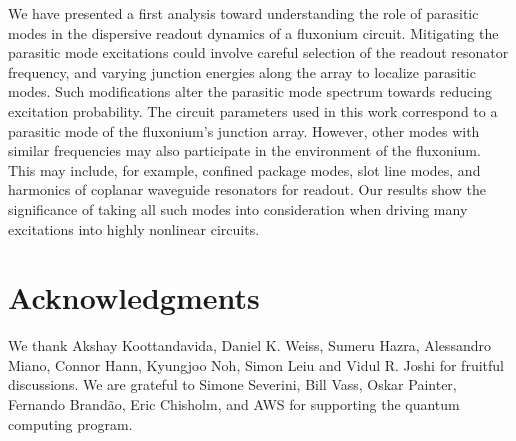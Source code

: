 \documentclass[%
reprint,
superscriptaddress,
 amsmath,amssymb,
 aps,
 prx,
longbibliography,
floatfix,
]{revtex4-2}
\begin{document}
We have presented a first analysis toward understanding the role of parasitic modes in the dispersive readout dynamics of a fluxonium circuit. Mitigating the parasitic mode excitations could involve careful selection of the readout resonator frequency, and varying junction energies along the array to localize parasitic modes. Such modifications alter the parasitic mode spectrum towards reducing excitation probability. The circuit parameters used in this work correspond to a parasitic mode of the fluxonium's junction array. However, other modes with similar frequencies may also participate in the environment of the fluxonium. This may include, for example, confined package modes, slot line modes, and harmonics of coplanar waveguide resonators for readout. Our results show the significance of taking all such modes into consideration when driving many excitations into highly nonlinear circuits.  

\section{Acknowledgments}
 We thank Akshay Koottandavida, Daniel K. Weiss, Sumeru Hazra, Alessandro Miano, Connor Hann, Kyungjoo Noh, Simon Leiu and Vidul R. Joshi for fruitful discussions. We are grateful to Simone Severini, Bill Vass, Oskar Painter, Fernando Brand\~ao, Eric Chisholm, and AWS for supporting the quantum computing program. %
\appendix
\end{document}
